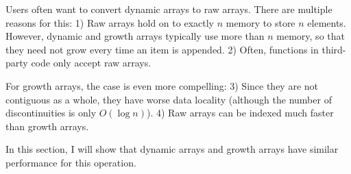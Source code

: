 Users often want to convert dynamic arrays to raw arrays. There are multiple reasons for this: 1) Raw arrays hold on to exactly $n$ memory to store $n$ elements. However, dynamic and growth arrays typically use more than $n$ memory, so that they need not grow every time an item is appended. 2) Often, functions in third-party code only accept raw arrays.

For growth arrays, the case is even more compelling: 3) Since they are not contiguous as a whole, they have worse data locality (although the number of discontinuities is only $O(\log n)$). 4) Raw arrays can be indexed much faster than growth arrays.

In this section, I will show that dynamic arrays and growth arrays have similar performance for this operation.